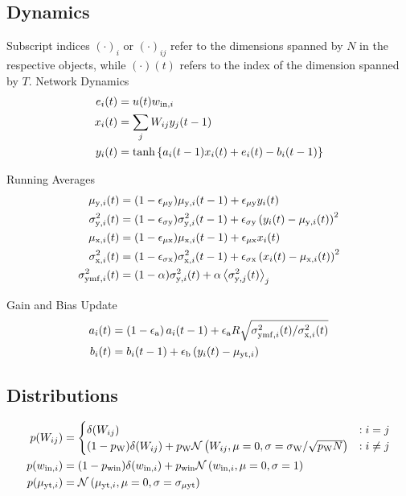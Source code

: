 \documentclass[12pt]{article}
\begin{document}
\subsection{Dynamics}
Subscript indices $(\cdot)_i$ or $(\cdot)_{ij}$ refer to the dimensions spanned by $N$ in the respective objects, while $(\cdot)(t)$ refers to the index of the dimension spanned by $T$.
\vskip 10pt
{\centering
Network Dynamics
\begin{align}
	e_i(t) &= u(t) w_{{\rm in},i} \\
	x_i(t) &= \sum_j W_{ij} y_j(t-1) \\
	y_i(t) &= \mathrm{tanh}\left\{a_i(t-1) x_i(t)  + e_i(t) - b_i(t-1)\right\}
\end{align}
}

{\centering
Running Averages
\begin{align}
	\mu_{{\rm y},i}(t) &= (1-\epsilon_{\rm \mu y})\mu_{{\rm y},i}(t-1) + \epsilon_{\rm \mu y} y_i(t) \\
	\sigma^2_{{\rm y},i}(t) &= (1-\epsilon_{\rm \sigma y})\sigma^2_{{\rm y},i}(t-1) + \epsilon_{\rm \sigma y}\left( y_i(t) -   \mu_{{\rm y},i}(t) \right)^2 \\
	\mu_{{\rm x},i}(t) &= (1-\epsilon_{\rm \mu x})\mu_{{\rm x},i}(t-1) + \epsilon_{\rm \mu x} x_i(t) \\
	\sigma^2_{{\rm x},i}(t) &= (1-\epsilon_{\rm \sigma x})\sigma^2_{{\rm x},i}(t-1) + \epsilon_{\rm \sigma x}\left( x_i(t) -   \mu_{{\rm x},i}(t) \right)^2 \\
	\sigma^2_{{\rm y mf},i}(t) &= (1-\alpha) \sigma^2_{{\rm y},i}(t) + \alpha \left\langle \sigma^2_{{\rm y},j}(t) \right\rangle_j
\end{align}
}

{\centering
	Gain and Bias Update
\begin{align}
	a_i(t) &= \left(1-\epsilon_{\rm a}\right) a_i(t-1) + \epsilon_{\rm a} R \sqrt{\sigma^2_{{\rm y mf},i}(t)/\sigma^2_{{\rm x},i}(t)} \\
	b_i(t) &= b_i(t-1) + \epsilon_{\rm b} \left( y_i(t) - \mu_{{\rm y t},i}\right)
\end{align}
}

\subsection{Distributions}

\begin{align}
p(W_{ij}) &= \begin{cases}
\delta(W_{ij}) &: i=j\\
(1-p_{\rm W})\delta(W_{ij}) + p_{\rm W} \mathcal{N}\left(W_{ij},\mu=0,\sigma = \sigma_{\rm W}/\sqrt{p_{\rm W} N}\right)  &: i\neq j\\
\end{cases} \\
p(w_{{\rm in},i}) &= (1-p_{\rm w in})\delta(w_{{\rm in},i}) + p_{\rm w in} \mathcal{N}\left(w_{{\rm in},i},\mu=0,\sigma=1\right) \\
p(\mu_{{\rm y t},i}) &= \mathcal{N}\left(\mu_{{\rm y t},i},\mu=0,\sigma=\sigma_{\rm \mu y t}\right)
\end{align}
\end{document}
